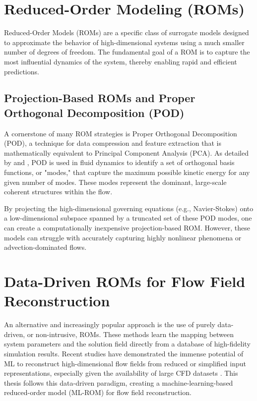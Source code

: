 \documentclass[dscexam, EN]{ufabcFHZh}
\begin{document}
\section{Reduced-Order Modeling (ROMs)}

Reduced-Order Models (ROMs) are a specific class of surrogate models designed to approximate the behavior of high-dimensional systems using a much smaller number of degrees of freedom. The fundamental goal of a ROM is to capture the most influential dynamics of the system, thereby enabling rapid and efficient predictions.

\subsection{Projection-Based ROMs and Proper Orthogonal Decomposition (POD)}

A cornerstone of many ROM strategies is Proper Orthogonal Decomposition (POD), a technique for data compression and feature extraction that is mathematically equivalent to Principal Component Analysis (PCA). As detailed by \citet{berkoozProper1993} and \citet{taira2017modal}, POD is used in fluid dynamics to identify a set of orthogonal basis functions, or "modes," that capture the maximum possible kinetic energy for any given number of modes. These modes represent the dominant, large-scale coherent structures within the flow.

By projecting the high-dimensional governing equations (e.g., Navier-Stokes) onto a low-dimensional subspace spanned by a truncated set of these POD modes, one can create a computationally inexpensive projection-based ROM. However, these models can struggle with accurately capturing highly nonlinear phenomena or advection-dominated flows.

\section{Data-Driven ROMs for Flow Field Reconstruction}

An alternative and increasingly popular approach is the use of purely data-driven, or non-intrusive, ROMs. These methods learn the mapping between system parameters and the solution field directly from a database of high-fidelity simulation results. Recent studies have demonstrated the immense potential of ML to reconstruct high-dimensional flow fields from reduced or simplified input representations, especially given the availability of large CFD datasets \citep{Zhang2023, Erichson2020b, Deng2021, cahalyPLICNet2024, champenoisMachine2024, xuSelfsupervised2023}. This thesis follows this data-driven paradigm, creating a machine-learning-based reduced-order model (ML-ROM) for flow field reconstruction.
\end{document}
